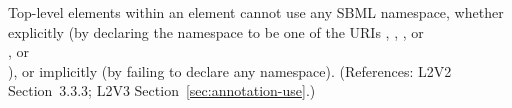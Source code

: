 Top-level elements within an  element cannot use any SBML
namespace, whether explicitly (by declaring the namespace to be one of the
URIs ,
, 
, or\\
, or\\
), or implicitly (by failing
to declare any namespace).  (References: L2V2 Section~3.3.3; L2V3
Section~\ref{sec:annotation-use}.)

